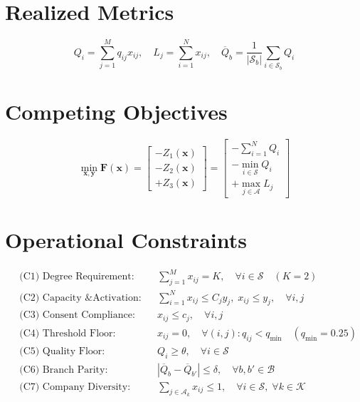 \documentclass[11pt,a4paper,oneside]{report}
\begin{document}
\section{Realized Metrics}
\begin{equation}
    Q_i = \sum_{j=1}^M q_{ij} x_{ij}, \quad L_j = \sum_{i=1}^N x_{ij}, \quad \overline{Q}_b = \frac{1}{|\mathcal{S}_b|} \sum_{i \in \mathcal{S}_b} Q_i
\end{equation}

\section{Competing Objectives}
\begin{equation}
    \min_{\mathbf{x}, \mathbf{y}} \mathbf{F}(\mathbf{x}) = \begin{bmatrix} -Z_1(\mathbf{x}) \\ -Z_2(\mathbf{x}) \\ +Z_3(\mathbf{x}) \end{bmatrix} = \begin{bmatrix} -\sum_{i=1}^N Q_i \\ -\min_{i \in \mathcal{S}} Q_i \\ +\max_{j \in \mathcal{A}} L_j \end{bmatrix}
\end{equation}

\section{Operational Constraints}
\begin{align}
    &\text{(C1) Degree Requirement:} && \sum_{j=1}^M x_{ij} = K, \quad \forall i \in \mathcal{S} \quad (K=2) \\
    &\text{(C2) Capacity \& Activation:} && \sum_{i=1}^N x_{ij} \le C_j y_j, \; x_{ij} \le y_j, \quad \forall i, j \\
    &\text{(C3) Consent Compliance:} && x_{ij} \le c_j, \quad \forall i, j \\
    &\text{(C4) Threshold Floor:} && x_{ij} = 0, \quad \forall (i, j): q_{ij} < q_{\min} \quad (q_{\min}=0.25) \\
    &\text{(C5) Quality Floor:} && Q_i \ge \theta, \quad \forall i \in \mathcal{S} \\
    &\text{(C6) Branch Parity:} && |\overline{Q}_b - \overline{Q}_{b'}| \le \delta, \quad \forall b, b' \in \mathcal{B} \\
    &\text{(C7) Company Diversity:} && \sum_{j \in \mathcal{A}_k} x_{ij} \le 1, \quad \forall i \in \mathcal{S}, \; \forall k \in \mathcal{K}
\end{align}
\end{document}
